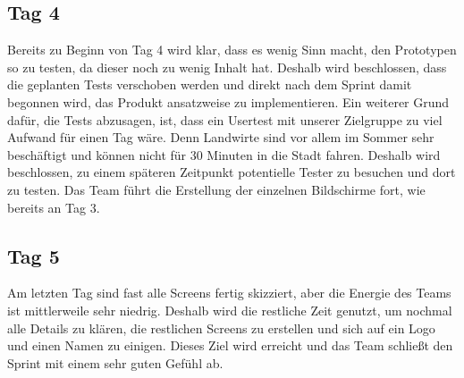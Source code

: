 \subsection*{\label{sec:Sprint-Umsetzung-Tag4}\thesubsection\quad Tag 4}Bereits zu Beginn von Tag 4 wird klar, dass es wenig Sinn macht, den Prototypen so zu testen, da dieser noch zu wenig Inhalt hat. Deshalb wird beschlossen, dass die geplanten Tests verschoben werden und direkt nach dem Sprint damit begonnen wird, das Produkt ansatzweise zu implementieren. Ein weiterer Grund dafür, die Tests abzusagen, ist, dass ein Usertest mit unserer Zielgruppe zu viel Aufwand für einen Tag wäre. Denn Landwirte sind vor allem im Sommer sehr beschäftigt und können nicht für 30 Minuten in die Stadt fahren. Deshalb wird beschlossen, zu einem späteren Zeitpunkt potentielle Tester zu besuchen und dort zu testen. Das Team führt die Erstellung der einzelnen Bildschirme fort, wie bereits an Tag 3.

\subsection*{\label{sec:Sprint-Umsetzung-Tag5}\thesubsection\quad Tag 5}Am letzten Tag sind fast alle Screens fertig skizziert, aber die Energie des Teams ist mittlerweile sehr niedrig. Deshalb wird die restliche Zeit genutzt, um nochmal alle Details zu klären, die restlichen Screens zu erstellen und sich auf ein Logo und einen Namen zu einigen. Dieses Ziel wird erreicht und das Team schließt den Sprint mit einem sehr guten Gefühl ab.


